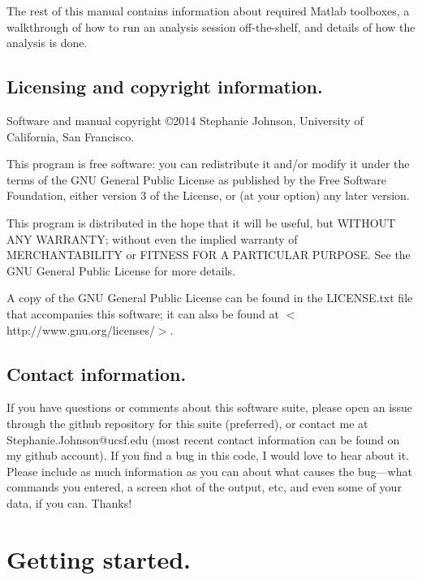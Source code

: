 \documentclass[11pt]{article}
\newcommand{\sj}[1]{\textcolor{red}{#1}}
\begin{document}
The rest of this manual contains information about required Matlab toolboxes, a walkthrough of how to run an analysis session off-the-shelf, and details of how the analysis is done.


\subsection{Licensing and copyright information.}

Software and manual copyright \copyright 2014 Stephanie Johnson, University of California, San Francisco.

This program is free software: you can redistribute it and/or modify
    it under the terms of the GNU General Public License as published by
    the Free Software Foundation, either version 3 of the License, or
    (at your option) any later version.

    This program is distributed in the hope that it will be useful,
    but WITHOUT ANY WARRANTY; without even the implied warranty of
    MERCHANTABILITY or FITNESS FOR A PARTICULAR PURPOSE.  See the
    GNU General Public License for more details.

    A copy of the GNU General Public License can be found in the LICENSE.txt file that accompanies this software; it can also be found at $<$http://www.gnu.org/licenses/$>$.
    
\subsection{Contact information.}

If you have questions or comments about this software suite, please open an issue through the github repository for this suite (preferred), or contact me at Stephanie.Johnson@ucsf.edu (most recent contact information can be found on my github account).  If you find a bug in this code, I would love to hear about it.  Please include as much information as you can about what causes the bug---what commands you entered, a screen shot of the output, etc, and even some of your data, if you can.  Thanks!

\clearpage

\section{Getting started.}
\end{document}
